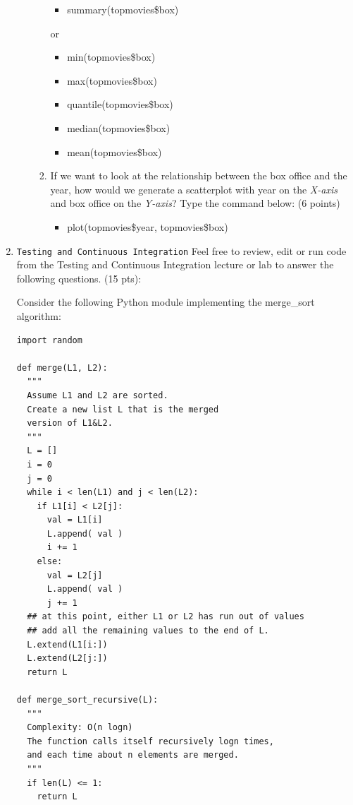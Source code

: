 \documentclass[10pt]{article}
\begin{document}
\begin{enumerate}
\begin{enumerate}
\begin{enumerate}
\begin{itemize}
			\item summary(topmovies\$box)
		\end{itemize}
	or
		\begin{itemize}
			\item min(topmovies\$box)
			\item max(topmovies\$box)
			\item quantile(topmovies\$box)
			\item median(topmovies\$box)
			\item mean(topmovies\$box)
        \end{itemize}
		\else
		\bigskip
		\bigskip
		\bigskip
		\bigskip
		\bigskip
  		\bigskip
		\bigskip
		\bigskip
		\bigskip
		\bigskip
		\bigskip
		\bigskip
		\fi
		
		\item If we want to look at the relationship between the box office and the year, how would we generate a scatterplot with year on the \textit{X-axis} and box office on the \textit{Y-axis}? Type the command below: (6 points)
		\beginanswers
		\begin{itemize}
			\item plot(topmovies\$year, topmovies\$box)
		\end{itemize}
		\else
		\bigskip
		\bigskip
		\bigskip
		\bigskip
		\fi
	\end{enumerate}
		
\end{enumerate}

\newpage


\item \texttt{Testing and Continuous Integration} Feel free to review, edit or run code from the Testing and Continuous Integration lecture or lab to answer the following questions. (15 pts):
\bigskip

Consider the following Python module implementing the merge\_sort algorithm:
\begin{verbatim}
import random

def merge(L1, L2):
  """
  Assume L1 and L2 are sorted.
  Create a new list L that is the merged
  version of L1&L2.
  """
  L = []
  i = 0
  j = 0
  while i < len(L1) and j < len(L2):
    if L1[i] < L2[j]:
      val = L1[i]
      L.append( val )
      i += 1
    else:
      val = L2[j]
      L.append( val )
      j += 1
  ## at this point, either L1 or L2 has run out of values
  ## add all the remaining values to the end of L.
  L.extend(L1[i:]) 
  L.extend(L2[j:])
  return L

def merge_sort_recursive(L):
  """ 
  Complexity: O(n logn)
  The function calls itself recursively logn times,
  and each time about n elements are merged.
  """
  if len(L) <= 1:
    return L


\end{verbatim}
\end{enumerate}
\end{document}
